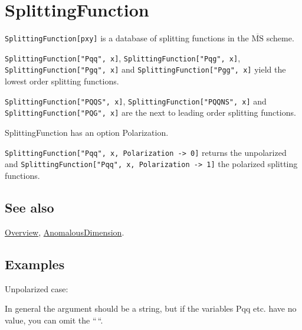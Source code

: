 \documentclass[../FeynCalcManual.tex]{subfiles}
\begin{document}
\hypertarget{splittingfunction}{
\section{SplittingFunction}\label{splittingfunction}}

\texttt{SplittingFunction[\allowbreak{}pxy]} is a database of splitting
functions in the \(\overline{\textrm{MS}}\) scheme.

\texttt{SplittingFunction[\allowbreak{}"Pqq",\ \allowbreak{}x]},
\texttt{SplittingFunction[\allowbreak{}"Pqg",\ \allowbreak{}x]},
\texttt{SplittingFunction[\allowbreak{}"Pgq",\ \allowbreak{}x]} and
\texttt{SplittingFunction[\allowbreak{}"Pgg",\ \allowbreak{}x]} yield
the lowest order splitting functions.

\texttt{SplittingFunction[\allowbreak{}"PQQS",\ \allowbreak{}x]},
\texttt{SplittingFunction[\allowbreak{}"PQQNS",\ \allowbreak{}x]} and
\texttt{SplittingFunction[\allowbreak{}"PQG",\ \allowbreak{}x]} are the
next to leading order splitting functions.

SplittingFunction has an option Polarization.

\texttt{SplittingFunction[\allowbreak{}"Pqq",\ \allowbreak{}x,\ \allowbreak{}Polarization -> 0]}
returns the unpolarized and
\texttt{SplittingFunction[\allowbreak{}"Pqq",\ \allowbreak{}x,\ \allowbreak{}Polarization -> 1]}
the polarized splitting functions.

\subsection{See also}

\hyperlink{toc}{Overview},
\hyperlink{anomalousdimension}{AnomalousDimension}.

\subsection{Examples}

Unpolarized case:

In general the argument should be a string, but if the variables Pqq
etc. have no value, you can omit the ``\,``.

\begin{Shaded}
\begin{Highlighting}[]
\OperatorTok{[}\OperatorTok{,}\OtherTok{{-}\textgreater{}} \OperatorTok{]} \OperatorTok{[}\OperatorTok{]}\NormalTok{ :\textgreater{} }\OperatorTok{[}\OperatorTok{]}
\end{Highlighting}
\end{Shaded}
\end{document}
